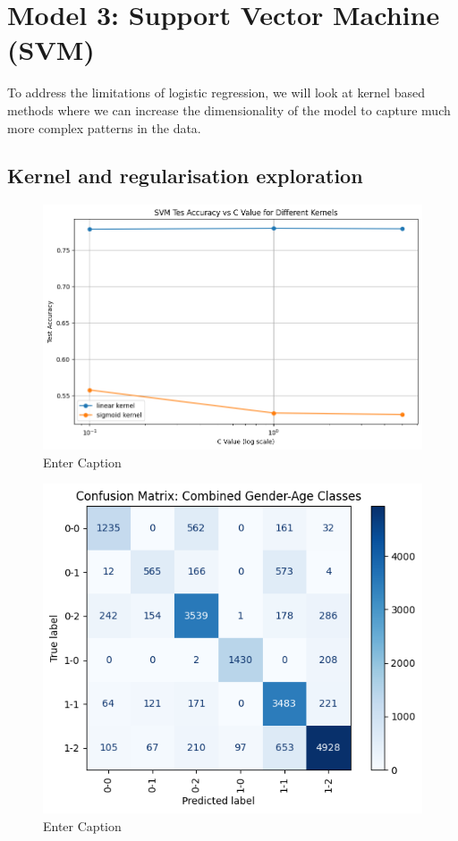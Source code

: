 \documentclass[10pt,twocolumn]{article}
\begin{document}
\clearpage
\section{Model 3: Support Vector Machine (SVM)}
To address the limitations of logistic regression, we will look at kernel based methods where we can increase the dimensionality of the model to capture much more complex patterns in the data.

\subsection{Kernel and regularisation exploration}
\begin{figure}[H]
    \centering
    \includegraphics[width=1\linewidth]{images/svm/svm-linear-vs-kernel-and-regularisation.png}
    \caption{Enter Caption}
    \label{fig:svm-kernels}
\end{figure}

\begin{figure}[H]
    \centering
    \includegraphics[width=1\linewidth]{images/svm/svm-cm-linear-vs-kernel-and-regularisation.png}
    \caption{Enter Caption}
    \label{fig:svm-cm-kernels}
\end{figure}
\end{document}
